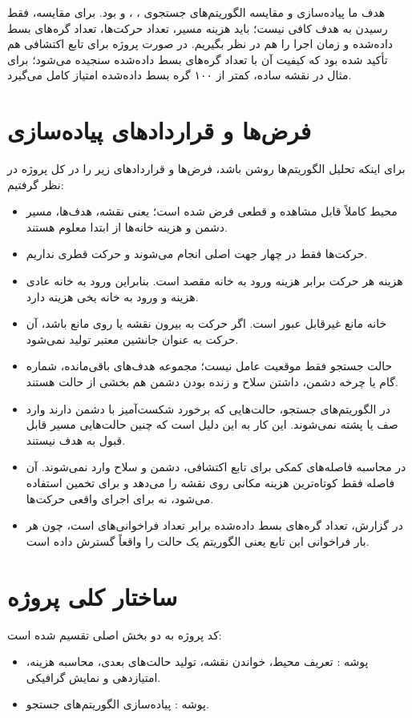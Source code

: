 \documentclass[10.5pt]{exam}
\begin{document}
هدف ما پیاده‌سازی و مقایسه الگوریتم‌های جستجوی
،
،
و
بود. برای مقایسه، فقط رسیدن به هدف کافی نیست؛ باید هزینه مسیر، تعداد حرکت‌ها، تعداد گره‌های بسط داده‌شده و زمان اجرا را هم در نظر بگیریم. در صورت پروژه برای تابع اکتشافی
هم تأکید شده بود که کیفیت آن با تعداد گره‌های بسط داده‌شده سنجیده می‌شود؛ برای مثال در نقشه ساده، کمتر از ۱۰۰ گره بسط داده‌شده امتیاز کامل می‌گیرد.

\section{فرض‌ها و قراردادهای پیاده‌سازی}
برای اینکه تحلیل الگوریتم‌ها روشن باشد، فرض‌ها و قراردادهای زیر را در کل پروژه در نظر گرفتیم:
\begin{itemize}
    \item محیط کاملاً قابل مشاهده و قطعی فرض شده است؛ یعنی نقشه، هدف‌ها، مسیر دشمن و هزینه خانه‌ها از ابتدا معلوم هستند.
    \item حرکت‌ها فقط در چهار جهت اصلی انجام می‌شوند و حرکت قطری نداریم.
    \item هزینه هر حرکت برابر هزینه ورود به خانه مقصد است. بنابراین ورود به خانه عادی هزینه
    و ورود به خانه یخی هزینه
    دارد.
    \item خانه
    مانع غیرقابل عبور است. اگر حرکت به بیرون نقشه یا روی مانع باشد، آن حرکت به عنوان جانشین معتبر تولید نمی‌شود.
    \item حالت جستجو فقط موقعیت عامل نیست؛ مجموعه هدف‌های باقی‌مانده، شماره گام یا چرخه دشمن، داشتن سلاح و زنده بودن دشمن هم بخشی از حالت هستند.
    \item در الگوریتم‌های جستجو، حالت‌هایی که برخورد شکست‌آمیز با دشمن دارند وارد صف یا پشته نمی‌شوند. این کار به این دلیل است که چنین حالت‌هایی مسیر قابل قبول به هدف نیستند.
    \item در محاسبه فاصله‌های کمکی برای تابع اکتشافی، دشمن و سلاح وارد
    نمی‌شوند. آن فاصله فقط کوتاه‌ترین هزینه مکانی روی نقشه را می‌دهد و برای تخمین استفاده می‌شود، نه برای اجرای واقعی حرکت‌ها.
    \item در گزارش، تعداد گره‌های بسط داده‌شده برابر تعداد فراخوانی‌های
    است، چون هر بار فراخوانی این تابع یعنی الگوریتم یک حالت را واقعاً گسترش داده است.
\end{itemize}

\section{ساختار کلی پروژه}
کد پروژه به دو بخش اصلی تقسیم شده است:
\begin{itemize}
    \item پوشه : تعریف محیط، خواندن نقشه، تولید حالت‌های بعدی، محاسبه هزینه، امتیازدهی و نمایش گرافیکی.
    \item پوشه : پیاده‌سازی الگوریتم‌های جستجو.
\end{itemize}
\end{document}
